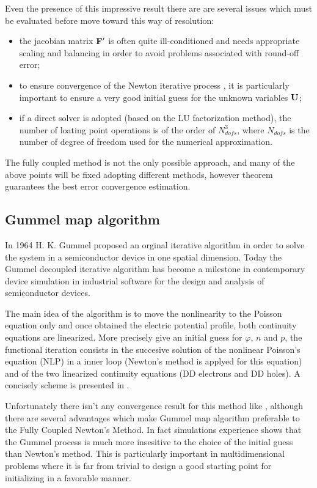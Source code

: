 Even the presence of this impressive result there are are several issues which must be evaluated before move toward this way of resolution:
\begin{itemize}
\item the jacobian matrix $\mathbf{F'}$ is often quite ill-conditioned and needs appropriate scaling and balancing in order to avoid problems associated with round-off error;
\item to ensure convergence of the Newton iterative process , it is particularly important to ensure a very good initial guess for the unknown variables $\mathbf{U}$;
\item if a direct solver is adopted (based on the LU factorization method), the number of loating point operations is of the order of  $N_{dofs}^3$, where $N_{dofs}$ is the number of degree of freedom used for the numerical approximation.
\end{itemize}

The fully coupled method is not the only possible approach, and many of the above points will be fixed adopting different methods, however theorem  guarantees the best error convergence estimation.

\subsection{Gummel map algorithm}

In 1964 H. K. Gummel proposed an orginal iterative algorithm in order to solve the system  in a semiconductor device in one spatial dimension. Today the Gummel decoupled iterative algorithm has become a milestone in contemporary device simulation in industrial software for the design and analysis of semiconductor devices.

The main idea of the algorithm is to move the nonlinearity to the Poisson equation only and once obtained the electric potential profile, both continuity equations are linearized.  More precisely give an initial guess for $\varphi$, $n$ and $p$, the functional iteration consists in the succesive solution of the nonlinear Poisson's equation (NLP) in a inner loop (Newton's method is applyed for this equation) and of the two linearized continuity equations (DD electrons and DD holes). 
A concisely scheme is presented in .

Unfortunately there isn't any convergence result for this method like , although there are several advantages which make Gummel map algorithm preferable to the Fully Coupled Newton's Method.
In fact simulations experience shows that the Gummel process is much more insesitive to the choice of the initial guess than Newton's method. This is particularly important in multidimensional problems where it is far from trivial to design a good starting point for initializing in a favorable manner.

